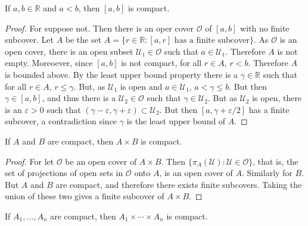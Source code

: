 \documentclass{article}                                                        %
\begin{document}
        \begin{theorem}
            If $a,b\in\mathbb{R}$ and $a<b$, then $[a,b]$ is compact.
        \end{theorem}
        \begin{proof}
            For suppose not. Then there is an oper cover $\mathcal{O}$ of
            $[a,b]$ with no finite subcover. Let $A$ be the set
            $A=\{r\in\mathbb{R}:[a,r]\textrm{ has a finite subcover}\}$.
            As $\mathcal{O}$ is an open cover, there is an open subset
            $\mathcal{U}_{1}\in\mathcal{O}$ such that $a\in\mathcal{U}_{1}$.
            Therefore $A$ is not empty. Moreoever, since $[a,b]$ is not compact,
            for all $r\in{A}$, $r<b$. Therefore $A$ is bounded above. By the
            least upper bound property there is a $\gamma\in\mathbb{R}$ such
            that for all $r\in{A}$, $r\leq\gamma$. But, as $\mathcal{U}_{1}$ is
            open and $a\in\mathcal{U}_{1}$, $a<\gamma\leq{b}$. But then
            $\gamma\in[a,b]$, and thus there is a
            $\mathcal{U}_{2}\in\mathcal{O}$ such that
            $\gamma\in\mathcal{U}_{2}$. But as $\mathcal{U}_{2}$ is open, there
            is an $\varepsilon>0$ such that
            $(\gamma-\varepsilon,\gamma+\varepsilon)\subset\mathcal{U}_{2}$.
            But then $[a,\gamma+\varepsilon/2]$ has a finite subcover, a
            contradiction since $\gamma$ is the least upper bound of $A$.
        \end{proof}
        \begin{theorem}
            \label{thm:product_of_compact_is_compact}%
            If $A$ and $B$ are compact, then $A\times{B}$ is compact.
        \end{theorem}
        \begin{proof}
            For let $\mathcal{O}$ be an open cover of $A\times{B}$. Then
            $\{\pi_{A}(\mathcal{U}):\mathcal{U}\in\mathcal{O}\}$, that is,
            the set of projections of open sets in $\mathcal{O}$ onto $A$,
            is an open cover of $A$. Similarly for $B$. But $A$ and $B$ are
            compact, and therefore there exists finite subcovers. Taking
            the union of these two gives a finite subcover of $A\times{B}$.
        \end{proof}
        \begin{theorem}
            \label{thm:finite_product_of_compact_is_compact}%
            If $A_{1},\hdots,A_{n}$ are compact, then
            $A_{1}\times\cdots\times{A_{n}}$ is compact.
        \end{theorem}
\end{document}
